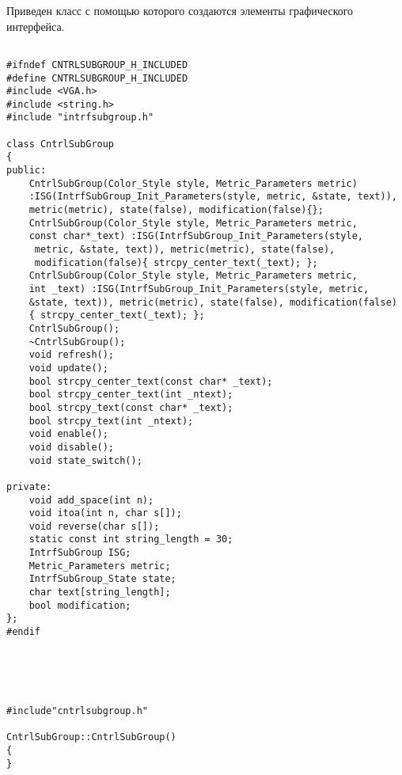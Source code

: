 
Приведен класс с помощью которого создаются элементы графического интерфейса.
\begin{verbatim}

#ifndef CNTRLSUBGROUP_H_INCLUDED
#define CNTRLSUBGROUP_H_INCLUDED
#include <VGA.h>
#include <string.h>
#include "intrfsubgroup.h"

class CntrlSubGroup
{
public:
	CntrlSubGroup(Color_Style style, Metric_Parameters metric) 
	:ISG(IntrfSubGroup_Init_Parameters(style, metric, &state, text)), 
	metric(metric), state(false), modification(false){};
	CntrlSubGroup(Color_Style style, Metric_Parameters metric, 
	const char*_text) :ISG(IntrfSubGroup_Init_Parameters(style,
	 metric, &state, text)), metric(metric), state(false), 
	 modification(false){ strcpy_center_text(_text); };
	CntrlSubGroup(Color_Style style, Metric_Parameters metric, 
	int _text) :ISG(IntrfSubGroup_Init_Parameters(style, metric, 
	&state, text)), metric(metric), state(false), modification(false)
	{ strcpy_center_text(_text); };
	CntrlSubGroup();
	~CntrlSubGroup();
	void refresh();
	void update();
	bool strcpy_center_text(const char* _text);
	bool strcpy_center_text(int _ntext);
	bool strcpy_text(const char* _text);
	bool strcpy_text(int _ntext);
	void enable();
	void disable();
	void state_switch();

private:
	void add_space(int n);
	void itoa(int n, char s[]);
	void reverse(char s[]);
	static const int string_length = 30;
	IntrfSubGroup ISG;
	Metric_Parameters metric;
	IntrfSubGroup_State state;
	char text[string_length];
	bool modification;
};
#endif





#include"cntrlsubgroup.h"

CntrlSubGroup::CntrlSubGroup()
{
}


\end{verbatim}
